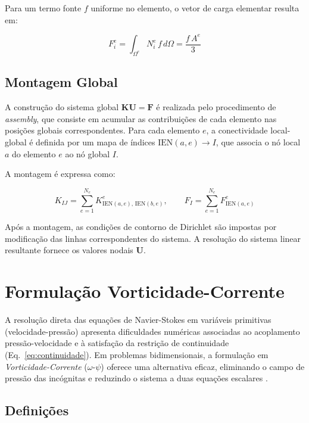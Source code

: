 Para um termo fonte $f$ uniforme no elemento, o vetor de carga elementar resulta em:

\begin{equation}
F_i^e = \int_{\Omega^e} N_i^e \, f \, d\Omega = \frac{f \, A^e}{3}
\label{eq:carga_elementar}
\end{equation}

\subsection{Montagem Global}
\label{sec:montagem_global}

A construção do sistema global $\mathbf{K} \mathbf{U} = \mathbf{F}$ é realizada pelo procedimento de \textit{assembly}, que consiste em acumular as contribuições de cada elemento nas posições globais correspondentes. Para cada elemento $e$, a conectividade local-global é definida por um mapa de índices $\text{IEN}(a, e) \to I$, que associa o nó local $a$ do elemento $e$ ao nó global $I$.

A montagem é expressa como:

\begin{equation}
K_{IJ} = \sum_{e=1}^{N_e} K_{\text{IEN}(a,e), \, \text{IEN}(b,e)}^e, \qquad
F_I = \sum_{e=1}^{N_e} F_{\text{IEN}(a,e)}^e
\label{eq:assembly}
\end{equation}

Após a montagem, as condições de contorno de Dirichlet são impostas por modificação das linhas correspondentes do sistema. A resolução do sistema linear resultante fornece os valores nodais $\mathbf{U}$.

\section{Formulação Vorticidade-Corrente}
\label{sec:vorticidade_corrente}

A resolução direta das equações de Navier-Stokes em variáveis primitivas (velocidade-pressão) apresenta dificuldades numéricas associadas ao acoplamento pressão-velocidade e à satisfação da restrição de continuidade (Eq.~\ref{eq:continuidade}). Em problemas bidimensionais, a formulação em \textit{Vorticidade-Corrente} ($\omega$-$\psi$) oferece uma alternativa eficaz, eliminando o campo de pressão das incógnitas e reduzindo o sistema a duas equações escalares \cite{Maliska2004}.

\subsection{Definições}

